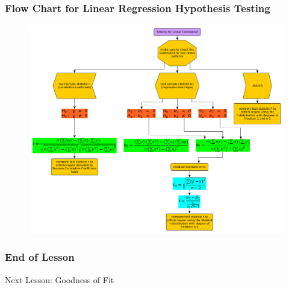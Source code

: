 \documentclass[xcolor=dvipsnames]{beamer}
\begin{document}


\begin{frame}
  \frametitle{Flow Chart for Linear Regression Hypothesis Testing}
\begin{figure}[h]
\includegraphics[scale=.24]{./diagrams/linear-regression.png}
\end{figure}
\end{frame}

\begin{frame}
  \frametitle{End of Lesson}
Next Lesson: Goodness of Fit
\end{frame}
\end{document}
